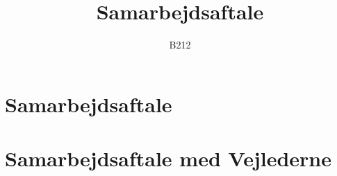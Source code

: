 \documentclass{report}
\title{Samarbejdsaftale}
\author{B212}
\begin{document}
\maketitle
\tableofcontents
\chapter{Samarbejdsaftale}









%
\chapter{Samarbejdsaftale med Vejlederne}




\end{document}
